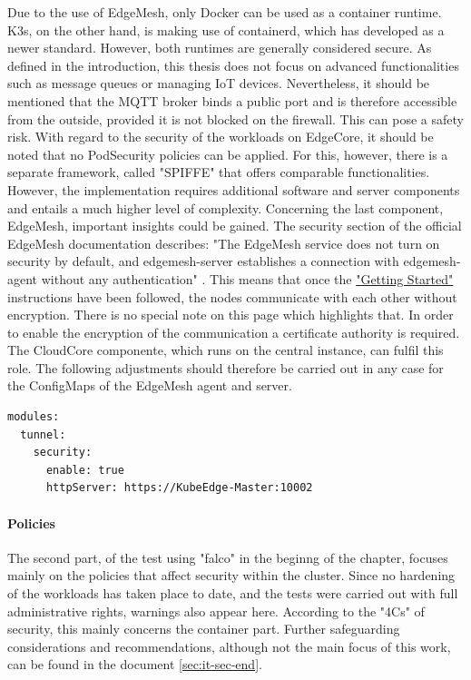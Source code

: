 \documentclass[MSC,Master,english]{twbook}%
\begin{document}
Due to the use of EdgeMesh, only Docker can be used as a container runtime. K3s, on the other hand, is making use of containerd, which has developed as a newer standard. However, both runtimes are generally considered secure. As defined in the introduction, this thesis does not focus on advanced functionalities such as message queues or managing IoT devices. Nevertheless, it should be mentioned that the MQTT broker binds a public port\cite{bk-gh-ke-node-test} and is therefore accessible from the outside, provided it is not blocked on the firewall. This can pose a safety risk. With regard to the security of the workloads on EdgeCore, it should be noted that no PodSecurity policies can be applied. For this, however, there is a separate framework, called "SPIFFE" that offers comparable functionalities\cite{ke-secure-fw}. However, the implementation requires additional software and server components and entails a much higher level of complexity. Concerning the last component, EdgeMesh, important insights could be gained. The security section of the official EdgeMesh documentation describes: "The EdgeMesh service does not turn on security by default, and edgemesh-server establishes a connection with edgemesh-agent without any authentication" \cite{em-security}. This means that once the \hyperref{https://edgemesh.netlify.app/guide/getting-started.html}{}{}{"Getting Started"}\cite{em-getstart} instructions have been followed, the nodes communicate with each other without encryption. There is no special note on this page which highlights that. In order to enable the encryption of the communication a certificate authority is required. The CloudCore componente, which runs on the central instance, can fulfil this role. The following adjustments should therefore be carried out in any case for the ConfigMaps of the EdgeMesh agent and server.

\begin{lstlisting}[caption={EdgeMesh security\cite{bk-gh-ke-node-test}},captionpos=b]
modules:
  tunnel:
    security:
      enable: true
      httpServer: https://KubeEdge-Master:10002
\end{lstlisting}

\paragraph{Policies} The second part, of the test using "falco"\cite{falco-scan} in the beginng of the chapter, focuses mainly on the policies that affect security within the cluster. Since no hardening of the workloads has taken place to date, and the tests were carried out with full administrative rights, warnings also appear here. According to the "4Cs" of security, this mainly concerns the container part. Further safeguarding considerations and recommendations, although not the main focus of this work, can be found in the document \autoref{sec:it-sec-end}.
\end{document}
